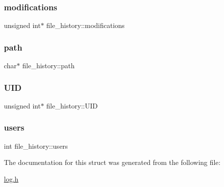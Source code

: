 \subsubsection{\texorpdfstring{modifications}{modifications}}
{\footnotesize\ttfamily unsigned int$\ast$ file\+\_\+history\+::modifications}

\mbox{\label{structfile__history_ab87fc279f8d0a188908e4eadcfafe413_ab87fc279f8d0a188908e4eadcfafe413}} 
\subsubsection{\texorpdfstring{path}{path}}
{\footnotesize\ttfamily char$\ast$ file\+\_\+history\+::path}

\mbox{\label{structfile__history_af68cfa8654b9bff4194c418ac6a2df43_af68cfa8654b9bff4194c418ac6a2df43}} 
\subsubsection{\texorpdfstring{U\+ID}{UID}}
{\footnotesize\ttfamily unsigned int$\ast$ file\+\_\+history\+::\+U\+ID}

\mbox{\label{structfile__history_a543dae7adc950e19e59aa9e88a658d3b_a543dae7adc950e19e59aa9e88a658d3b}} 
\subsubsection{\texorpdfstring{users}{users}}
{\footnotesize\ttfamily int file\+\_\+history\+::users}



The documentation for this struct was generated from the following file\+:\begin{DoxyCompactItemize}
\item 
\hyperlink{log_8h}{log.\+h}\end{DoxyCompactItemize}
